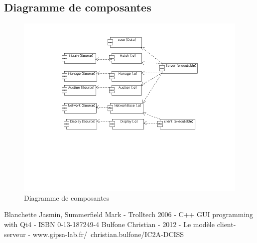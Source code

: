 \documentclass[a4paper,titlepage]{scrreprt}
\begin{document}
\subsection{Diagramme de composantes}
      \begin{figure}[H]
    \center
    \includegraphics[scale=0.4]{uml/Components.png}
    \caption{Diagramme de composantes}
    \end{figure}
\begin{thebibliography}{9}
 Blanchette Jasmin, Summerfield Mark - Trolltech 2006 - C++ GUI programming with Qt4 - ISBN 0-13-187249-4
 Bulfone Christian - 2012 - Le modèle client-serveur - www.gipsa-lab.fr/~christian.bulfone/IC2A-DCISS
\end{thebibliography}
\printindex
\end{document}

